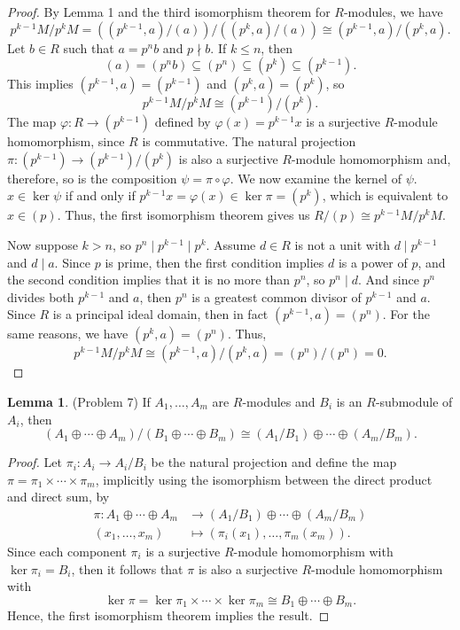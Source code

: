 \documentclass[12pt]{article}
\theoremstyle{definition}
\newtheorem{lemma}{Lemma}
\renewcommand{\phi}{\varphi}
\newcommand{\isom}{\cong}
\newcommand{\dsum}{\oplus}
\begin{document}
\begin{proof}
    By Lemma 1 and the third isomorphism theorem for $R$-modules, we have
    \[
        p^{k-1}M/p^kM 
            = ((p^{k-1}, a)/(a))/((p^k, a)/(a))
            \isom (p^{k-1}, a)/(p^k, a).
    \]
    Let $b \in R$ such that $a = p^nb$ and $p \nmid b$. If $k \leq n$, then
    \[
        (a) = (p^nb) \subseteq (p^n) \subseteq (p^k) \subseteq (p^{k-1}).
    \]
    This implies $(p^{k-1}, a) = (p^{k-1})$ and $(p^k, a) = (p^k)$, so
    \[
        p^{k-1}M/p^kM  \isom (p^{k-1})/(p^k).
    \]
    The map $\phi : R \to (p^{k-1})$ defined by $\phi(x) = p^{k-1}x$ is a surjective $R$-module homomorphism, since $R$ is commutative. The natural projection $\pi : (p^{k-1}) \to (p^{k-1})/(p^k)$ is also a surjective $R$-module homomorphism and, therefore, so is the composition $\psi = \pi \circ \phi$. We now examine the kernel of $\psi$. $x \in \ker \psi$ if and only if $p^{k-1}x = \phi(x) \in \ker\pi = (p^k)$, which is equivalent to $x \in (p)$. Thus, the first isomorphism theorem gives us $R/(p) \isom p^{k-1}M/p^kM$.
    
    Now suppose $k > n$, so $p^n \mid p^{k-1} \mid p^k$. Assume $d \in R$ is not a unit with $d \mid p^{k-1}$ and $d \mid a$. Since $p$ is prime, then the first condition implies $d$ is a power of $p$, and the second condition implies that it is no more than $p^n$, so $p^n \mid d$. And since $p^n$ divides both $p^{k-1}$ and $a$, then $p^n$ is a greatest common divisor of $p^{k-1}$ and $a$. Since $R$ is a principal ideal domain, then in fact $(p^{k-1}, a) = (p^n)$. For the same reasons, we have $(p^k, a) = (p^n)$. Thus,
    \[
          p^{k-1}M/p^kM 
            \isom (p^{k-1}, a)/(p^k, a)
            = (p^n)/(p^n)
            = 0.
    \]
    
\end{proof}


\begin{lemma}(Problem 7)
    If $A_1, \dots, A_m$ are $R$-modules and $B_i$ is an $R$-submodule of $A_i$, then
    \[
        (A_1 \dsum \cdots \dsum A_m)/(B_1 \dsum \cdots \dsum B_m) \isom (A_1/B_1) \dsum \cdots \dsum (A_m/B_m).
    \]
\end{lemma}

\begin{proof}
    Let $\pi_i : A_i \to A_i/B_i$ be the natural projection and define the map $\pi = \pi_1 \times \cdots \times \pi_m$, implicitly using the isomorphism between the direct product and direct sum, by
    \begin{align*}
        \pi : A_1 \dsum \cdots \dsum A_m &\to (A_1/B_1) \dsum \cdots \dsum (A_m/B_m) \\
            (x_1, \dots, x_m) &\mapsto (\pi_i(x_1), \dots, \pi_m(x_m)).
    \end{align*}
    Since each component $\pi_i$ is a surjective $R$-module homomorphism with $\ker\pi_i = B_i$, then it follows that $\pi$ is also a surjective $R$-module homomorphism with
    \[
        \ker\pi
            = \ker\pi_1 \times \cdots \times \ker\pi_m
            \isom B_1 \dsum \cdots \dsum B_m.
    \]
    Hence, the first isomorphism theorem implies the result.

\end{proof}
\end{document}
